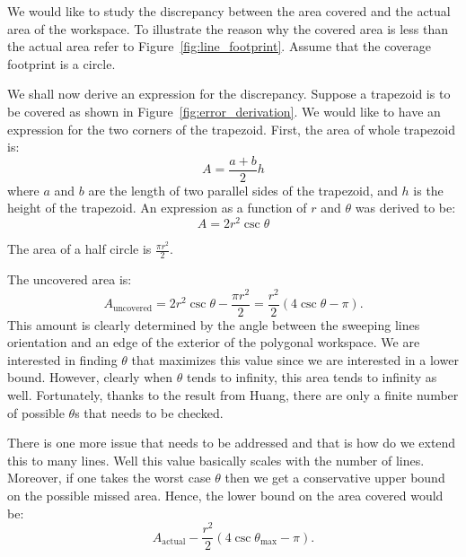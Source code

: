 \documentclass[../main.tex]{subfiles}
\begin{document}
We would like to study the discrepancy between the area covered and the actual area of the workspace. To illustrate the reason why the covered area is less than the actual area refer to Figure~\ref{fig:line_footprint}. Assume that the coverage footprint is a circle.


We shall now derive an expression for the discrepancy. Suppose a trapezoid is to be covered as shown in Figure~\ref{fig:error_derivation}. We would like to have an expression for the two corners of the trapezoid. First, the area of whole trapezoid is:
\begin{equation}
	A=\frac{a+b}{2}h
\end{equation}
where $a$ and $b$ are the length of two parallel sides of the trapezoid, and $h$ is the height of  the trapezoid. An expression as a function of $r$ and $\theta$ was derived to be:
\begin{equation}
	A=2r^2\csc\theta
\end{equation}

The area of a half circle is $\frac{\pi r^2}{2}$.

The uncovered area is:
\begin{equation}
	A_{\text{uncovered}}=2r^2\csc\theta-\frac{\pi r^2}{2}=\frac{r^2}{2}(4\csc\theta-\pi).
\end{equation}
This amount is clearly determined by the angle between the sweeping lines orientation and an edge of the exterior of the polygonal workspace. We are interested in finding $\theta$ that maximizes this value since we are interested in a lower bound. However, clearly when $\theta$ tends to infinity, this area tends to infinity as well. Fortunately, thanks to the result from Huang, there are only a finite number of possible $\theta$s that needs to be checked. 

%
%
%

There is one more issue that needs to be addressed and that is how do we extend this to many lines. Well this value basically scales with the number of lines. Moreover, if one takes the worst case $\theta$ then we get a conservative upper bound on the possible missed area. Hence, the lower bound on the area covered would be:
\begin{equation}
	A_{\text{actual}}-\frac{r^2}{2}(4\csc\theta_{\max}-\pi).
\end{equation}
\end{document}
